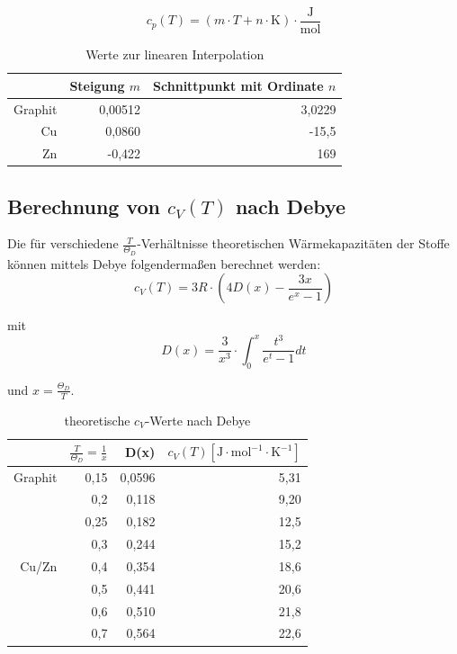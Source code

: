 \documentclass[12pt,a4paper,titlepage,headinclude,bibtotoc]{scrartcl}
\begin{document}
\begin{equation}
c_p(T) = \left( m\cdot T  + n \cdot \mathrm{K} \right) \cdot \frac{\mathrm{J}}{\mathrm{mol}}
\end{equation}


\begin{table} [h] 
\centering
\caption{Werte zur linearen Interpolation}
\begin{tabular} {r | r|  r }
& Steigung $m$& Schnittpunkt mit Ordinate $n$\\
\hline
Graphit& 0,00512&3,0229\\
Cu&	0,0860	&-15,5\\
Zn&	-0,422	&169\\
\end{tabular}
\end{table}


\subsection{Berechnung von $c_{V}(T)$ nach Debye}
Die für verschiedene $\frac{T}{\Theta_{D}}$-Verhältnisse theoretischen Wärmekapazitäten der Stoffe können mittels Debye folgendermaßen berechnet werden:\\

\begin{equation}
c_{V}(T)= 3R \cdot \left(4 D(x) - \frac{3x}{e^x -1}\right)
\end{equation}

mit \\

\begin{equation}
D(x) = \frac{3}{x^3}\cdot \int_{0}^{x} \frac{t^3}{e^t -1} dt
\end{equation}

und $x= \frac{\Theta_D}{T}$.


\begin{table} [h]
\centering
\caption{theoretische $c_V$-Werte nach Debye}
\begin{tabular} {r | r|  r | r}
&$\frac{T}{\Theta_D}=\frac{1}{x}$& D(x)&$c_V(T)[\mathrm{J}\cdot \mathrm{mol}^{-1} \cdot \mathrm{K}^{-1}]$\\
\hline
Graphit	&0,15&	0,0596	&5,31\\
	&0,2&	0,118	&9,20\\
	&0,25	&0,182&	12,5\\
	&0,3	&0,244	&15,2\\
	\hline			
Cu/Zn &	0,4	&0,354&	18,6\\
	&0,5&	0,441	&20,6\\
	&0,6	&0,510	&21,8\\
	&0,7&	0,564&22,6\\

\end{tabular}
\end{table}
\end{document}
